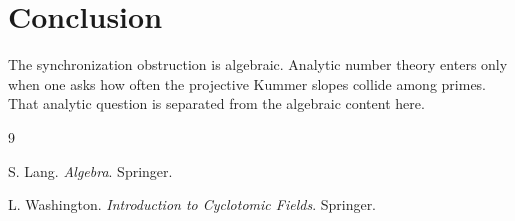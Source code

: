 \documentclass[11pt]{article}
\newcommand{\1}{\mathbf 1}
\begin{document}
\section{Conclusion}

The synchronization obstruction is algebraic.  Analytic number theory enters only when one asks how often the projective Kummer slopes collide among primes.  That analytic question is separated from the algebraic content here.


\begin{thebibliography}{9}

S. Lang.
\newblock \emph{Algebra}.
\newblock Springer.

L. Washington.
\newblock \emph{Introduction to Cyclotomic Fields}.
\newblock Springer.

\end{thebibliography}
\end{document}

